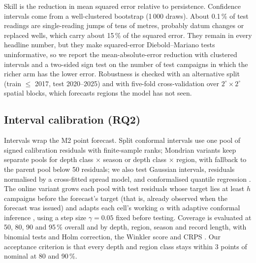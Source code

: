 \documentclass[11pt,a4paper]{article}
\begin{document}
Skill is the reduction in mean squared error relative to persistence. Confidence intervals come from a well-clustered
bootstrap (1\,000 draws). About 0.1\,\% of test readings are single-reading jumps of tens of metres, probably datum changes
or replaced wells, which carry about 15\,\% of the squared error. They remain in every headline number, but they make
squared-error Diebold--Mariano tests \citep{diebold1995comparing} uninformative, so we report the mean-absolute-error reduction
with clustered intervals and a two-sided sign test on the number of test campaigns in which the richer arm has the lower
error. Robustness is checked with an alternative split (train $\le$ 2017, test 2020--2025) and with five-fold cross-validation
over $2^\circ \times 2^\circ$ spatial blocks, which forecasts regions the model has not seen.

\subsection{Interval calibration (RQ2)}
Intervals wrap the M2 point forecast. Split conformal intervals \citep{lei2018distribution} use one pool of signed calibration
residuals with finite-sample ranks; Mondrian variants keep separate pools for depth class $\times$ season or depth class
$\times$ region, with fallback to the parent pool below 50 residuals; we also test Gaussian intervals, residuals normalised by
a cross-fitted spread model, and conformalised quantile regression \citep{romano2019cqr}. The online variant grows each pool
with test residuals whose target lies at least $h$ campaigns before the forecast's target (that is, already observed when the
forecast was issued) and adapts each cell's working $\alpha$ with adaptive conformal inference \citep{gibbs2021aci}, using a
step size $\gamma=0.05$ fixed before testing. Coverage is evaluated at 50, 80, 90 and 95\,\% overall and by depth, region,
season and record length, with binomial tests and Holm correction, the Winkler score and CRPS \citep{gneiting2007scoring}.
Our acceptance criterion is that every depth and region class stays within 3 points of nominal at 80 and 90\,\%.
\end{document}
